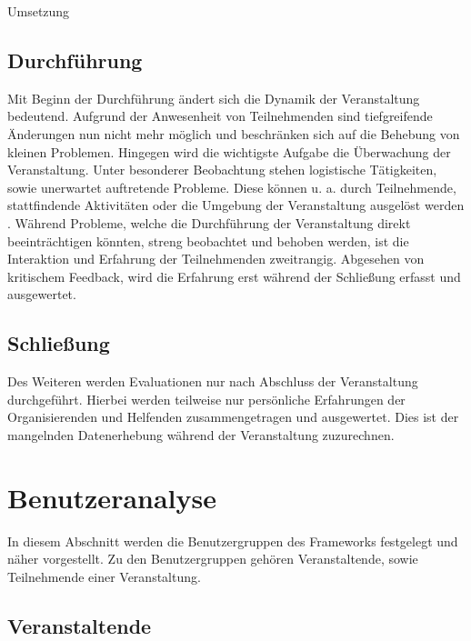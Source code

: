 Umsetzung

\subsection{Durchführung} \label{sec:analysis-org-durchfuehrung}

Mit Beginn der Durchführung ändert sich die Dynamik der Veranstaltung bedeutend.
Aufgrund der Anwesenheit von Teilnehmenden sind tiefgreifende Änderungen nun
nicht mehr möglich und beschränken sich auf die Behebung von kleinen Problemen.
Hingegen wird die wichtigste Aufgabe die Überwachung der Veranstaltung. Unter
besonderer Beobachtung stehen logistische Tätigkeiten, sowie unerwartet
auftretende Probleme. Diese können u. a. durch Teilnehmende, stattfindende
Aktivitäten oder die Umgebung der Veranstaltung ausgelöst werden
\cite{Bladen2017}. Während Probleme, welche die Durchführung der Veranstaltung
direkt beeinträchtigen könnten, streng beobachtet und behoben werden, ist die
Interaktion und Erfahrung der Teilnehmenden zweitrangig. Abgesehen von
kritischem Feedback, wird die Erfahrung erst während der Schließung erfasst und
ausgewertet.

\subsection{Schließung} \label{sec:analysis-org-schliessung}


Des Weiteren werden Evaluationen nur nach Abschluss der Veranstaltung
durchgeführt. Hierbei werden teilweise nur persönliche Erfahrungen der
Organisierenden und Helfenden zusammengetragen und ausgewertet. Dies ist der
mangelnden Datenerhebung während der Veranstaltung zuzurechnen.


\section{Benutzeranalyse} \label{sec:analysis-user}

In diesem Abschnitt werden die Benutzergruppen des Frameworks festgelegt und
näher vorgestellt. Zu den Benutzergruppen gehören Veranstaltende, sowie
Teilnehmende einer Veranstaltung.

\subsection{Veranstaltende}

